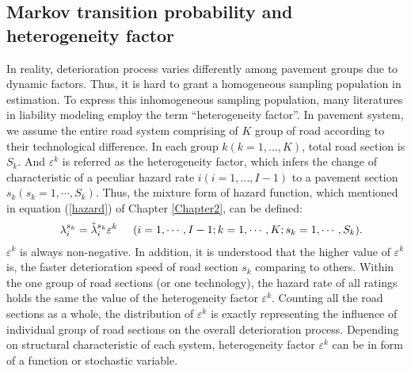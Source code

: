 \subsection{Markov transition probability and heterogeneity factor}
\label{641}
In reality, deterioration process varies differently among pavement groups due to dynamic factors. Thus, it is hard to grant a homogeneous sampling population in estimation. To express this inhomogeneous sampling population, many literatures in liability modeling employ the term ``heterogeneity factor''. In pavement system, we assume the entire road system comprising of $K$ group of road according to their technological difference. In each group $k (k=1,...,K)$, total road section is $S_k$. And $\varepsilon^k$ is referred as the heterogeneity factor, which infers the change of characteristic of a peculiar hazard rate $i(i=1,...,I-1)$ to a pavement section $s_k(s_k=1,\cdots,S_k)$. Thus, the mixture form of hazard function, which mentioned in equation (\ref{hazard}) of Chapter \ref{Chapter2}, can be defined:
\begin{eqnarray}
&& \lambda_i^{s_k} = \tilde{\lambda}_i^{s_k}\varepsilon^k \hspace{5mm}
 (i=1,\cdots,I-1;k=1,\cdots,K;s_k=1,\cdots,S_k).  \label{hu1}
\end{eqnarray}
$\varepsilon^k$ is always non-negative. In addition, it is understood that the higher value of $\varepsilon^k$ is, the faster deterioration speed of road section $s_k$ comparing to others. Within the one group of road sections (or one technology), the hazard rate of all ratings holds the same the value of the heterogeneity factor $\varepsilon^k$. Counting all the road sections as a whole, the distribution of $\varepsilon^k$ is exactly representing the influence of individual group of road sections on the overall deterioration process. Depending on structural characteristic of each system, heterogeneity factor $\varepsilon^k$ can be in form of a function or stochastic variable.

